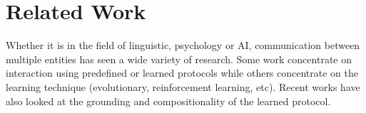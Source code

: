 

 
 





\section{Related Work}

Whether it is in the field of linguistic, psychology or AI, communication between multiple entities has seen a wide variety of research. Some work concentrate on interaction using predefined or learned protocols while others concentrate on the learning technique (evolutionary, reinforcement learning, etc). Recent works have also looked at the grounding and compositionality of the learned protocol. 

